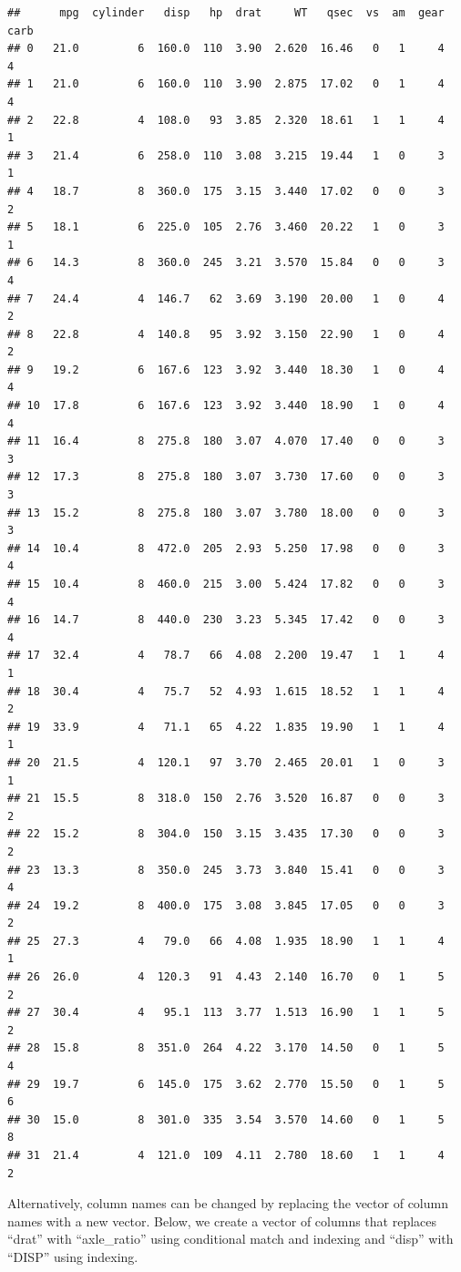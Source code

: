 \documentclass[
]{book}
\begin{document}
\begin{verbatim}
##      mpg  cylinder   disp   hp  drat     WT   qsec  vs  am  gear  carb
## 0   21.0         6  160.0  110  3.90  2.620  16.46   0   1     4     4
## 1   21.0         6  160.0  110  3.90  2.875  17.02   0   1     4     4
## 2   22.8         4  108.0   93  3.85  2.320  18.61   1   1     4     1
## 3   21.4         6  258.0  110  3.08  3.215  19.44   1   0     3     1
## 4   18.7         8  360.0  175  3.15  3.440  17.02   0   0     3     2
## 5   18.1         6  225.0  105  2.76  3.460  20.22   1   0     3     1
## 6   14.3         8  360.0  245  3.21  3.570  15.84   0   0     3     4
## 7   24.4         4  146.7   62  3.69  3.190  20.00   1   0     4     2
## 8   22.8         4  140.8   95  3.92  3.150  22.90   1   0     4     2
## 9   19.2         6  167.6  123  3.92  3.440  18.30   1   0     4     4
## 10  17.8         6  167.6  123  3.92  3.440  18.90   1   0     4     4
## 11  16.4         8  275.8  180  3.07  4.070  17.40   0   0     3     3
## 12  17.3         8  275.8  180  3.07  3.730  17.60   0   0     3     3
## 13  15.2         8  275.8  180  3.07  3.780  18.00   0   0     3     3
## 14  10.4         8  472.0  205  2.93  5.250  17.98   0   0     3     4
## 15  10.4         8  460.0  215  3.00  5.424  17.82   0   0     3     4
## 16  14.7         8  440.0  230  3.23  5.345  17.42   0   0     3     4
## 17  32.4         4   78.7   66  4.08  2.200  19.47   1   1     4     1
## 18  30.4         4   75.7   52  4.93  1.615  18.52   1   1     4     2
## 19  33.9         4   71.1   65  4.22  1.835  19.90   1   1     4     1
## 20  21.5         4  120.1   97  3.70  2.465  20.01   1   0     3     1
## 21  15.5         8  318.0  150  2.76  3.520  16.87   0   0     3     2
## 22  15.2         8  304.0  150  3.15  3.435  17.30   0   0     3     2
## 23  13.3         8  350.0  245  3.73  3.840  15.41   0   0     3     4
## 24  19.2         8  400.0  175  3.08  3.845  17.05   0   0     3     2
## 25  27.3         4   79.0   66  4.08  1.935  18.90   1   1     4     1
## 26  26.0         4  120.3   91  4.43  2.140  16.70   0   1     5     2
## 27  30.4         4   95.1  113  3.77  1.513  16.90   1   1     5     2
## 28  15.8         8  351.0  264  4.22  3.170  14.50   0   1     5     4
## 29  19.7         6  145.0  175  3.62  2.770  15.50   0   1     5     6
## 30  15.0         8  301.0  335  3.54  3.570  14.60   0   1     5     8
## 31  21.4         4  121.0  109  4.11  2.780  18.60   1   1     4     2
\end{verbatim}

Alternatively, column names can be changed by replacing the vector of column names with a new vector. Below, we create a vector of columns that replaces ``drat'' with ``axle\_ratio'' using conditional match and indexing and ``disp'' with ``DISP'' using indexing.
\end{document}
